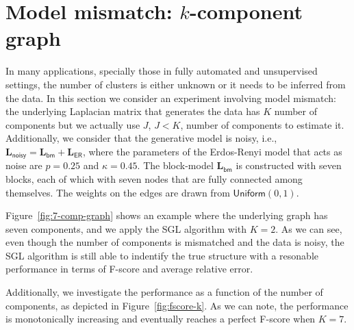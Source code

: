 \section{Model mismatch: $k$-component graph}

In many applications, specially those in fully automated and unsupervised settings,
the number of clusters is either unknown or it needs to be inferred from the data.
In this section we consider an experiment involving model mismatch: the underlying
Laplacian matrix that generates the data has $K$ number of components but we actually
use $J$, $J < K$, number of components to estimate it.
Additionally, we consider that the generative model is noisy, i.e.,
$\mathbf{L}_{\mathsf{noisy}} = \mathbf{L}_{\mathsf{bm}} + \mathbf{L}_{\mathsf{ER}}$,
where the parameters of the Erdos-Renyi model that acts as noise are $p = 0.25$ and
$\kappa = 0.45$. The block-model $\mathbf{L}_{\mathsf{bm}}$ is constructed with seven
blocks, each of which with seven nodes that are fully connected among themselves. The
weights on the edges are drawn from $\mathsf{Uniform}(0, 1)$.

Figure~\ref{fig:7-comp-graph} shows an example where the underlying graph has seven components,
and we apply the \textsf{SGL} algorithm with $K = 2$. As we can see, even though the number
of components is mismatched and the data is noisy, the \textsf{SGL} algorithm is still able
to indentify the true structure with a resonable performance in terms of F-score and average
relative error.

Additionally, we investigate the performance as a function of the number of components,
as depicted in Figure~\ref{fig:fscore-k}. As we can note, the performance is monotonically
increasing and eventually reaches a perfect F-score when $K = 7$.


